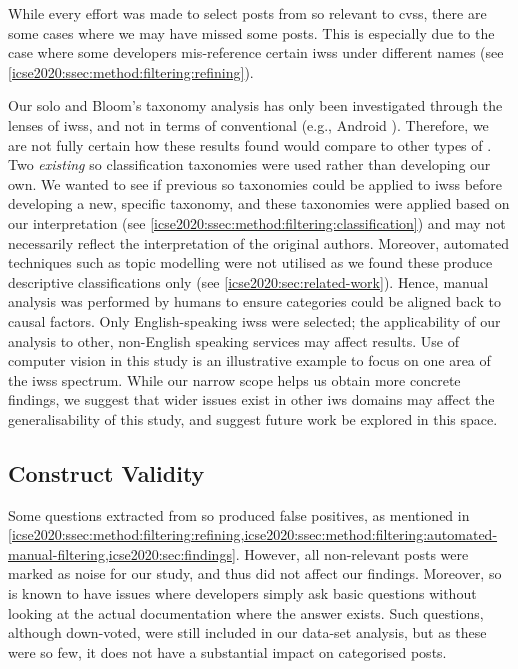 While every effort was made to select posts from \gls{so} relevant to \glspl{cvs}, there are some cases where we may have missed some posts. This is especially due to the case where some developers mis-reference certain \glspl{iws} under different names (see \cref{icse2020:ssec:method:filtering:refining}).

%
Our \gls{solo} and Bloom's taxonomy analysis has only been investigated through the lenses of \glspl{iws}, and not in terms of conventional  (e.g., Android ). Therefore, we are not fully certain how these results found would compare to other types of . %
%
Two \textit{existing} \gls{so} classification taxonomies were used rather than developing our own. We wanted to see if previous \gls{so} taxonomies could be applied to \glspl{iws} before developing a new, specific taxonomy, and these taxonomies were applied based on our interpretation  (see \cref{icse2020:ssec:method:filtering:classification}) and may not necessarily reflect the interpretation of the original authors. Moreover, automated techniques such as topic modelling were not utilised as we found these produce descriptive classifications only (see \cref{icse2020:sec:related-work}). Hence, manual analysis was performed by humans to ensure categories could be aligned back to causal factors.
%
Only English-speaking \glspl{iws} were selected; the applicability of our analysis to other, non-English speaking services may affect results.
%
Use of computer vision in this study is an illustrative example to focus on one area of the \glspl{iws} spectrum. While our narrow scope helps us obtain more concrete findings, we suggest that wider issues exist in other \gls{iws} domains may affect the generalisability of this study, and suggest future work be explored in this space.

\subsection{Construct Validity}

Some questions extracted from \gls{so} produced false positives, as mentioned in \cref{icse2020:ssec:method:filtering:refining,icse2020:ssec:method:filtering:automated-manual-filtering,icse2020:sec:findings}. However, all non-relevant posts were marked as noise for our study, and thus did not affect our findings.
%
Moreover, \gls{so} is known to have issues where developers simply ask basic questions without looking at the actual documentation where the answer exists. Such questions, although down-voted, were still included in our data-set analysis, but as these were \gls{so} few, it does not have a substantial impact on categorised posts.

